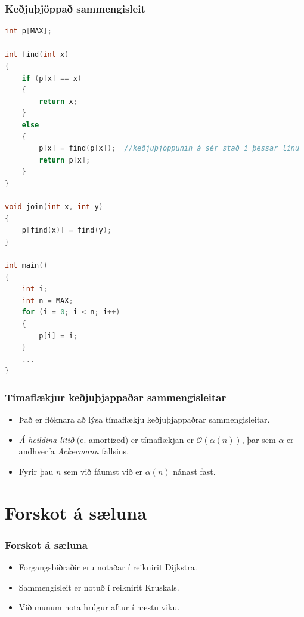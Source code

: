 \documentclass{beamer}
\begin{document}
\begin{frame}[fragile]
	\frametitle{Keðjuþjöppað sammengisleit}
\tiny
\begin{lstlisting}[language=C++]
int p[MAX];

int find(int x)
{
	if (p[x] == x)
	{
		return x;
	}
	else
	{
		p[x] = find(p[x]);	//keðjuþjöppunin á sér stað í þessar línu
		return p[x];
	}
}

void join(int x, int y)
{
	p[find(x)] = find(y);
}

int main()
{
	int i;
	int n = MAX;
	for (i = 0; i < n; i++)
	{
		p[i] = i;
	}
	...
}
\end{lstlisting}
\end{frame}

\begin{frame}
\frametitle{Tímaflækjur keðjuþjappaðar sammengisleitar}
\begin{itemize}
	\item<1-> Það er flóknara að lýsa tímaflækju keðjuþjappaðrar sammengisleitar.
	\item<2-> \emph{Á heildina litið} (e. amortized) er tímaflækjan er $\mathcal{O}(\alpha(n))$, þar sem $\alpha$ er andhverfa \emph{Ackermann} fallsins.
	\item<3-> Fyrir þau $n$ sem við fáumst við er $\alpha(n)$ nánast fast.
\end{itemize}
\end{frame}

\section[Forskot á sæluna]{Forskot á sæluna}

\begin{frame}[fragile]
\frametitle{Forskot á sæluna}
\begin{itemize}

\item<1-> Forgangsbiðraðir eru notaðar í reiknirit Dijkstra.
\item<2-> Sammengisleit er notuð í reiknirit Kruskals.
\item<3-> Við munum nota hrúgur aftur í næstu viku.

\end{itemize}
\end{frame}
\end{document}
